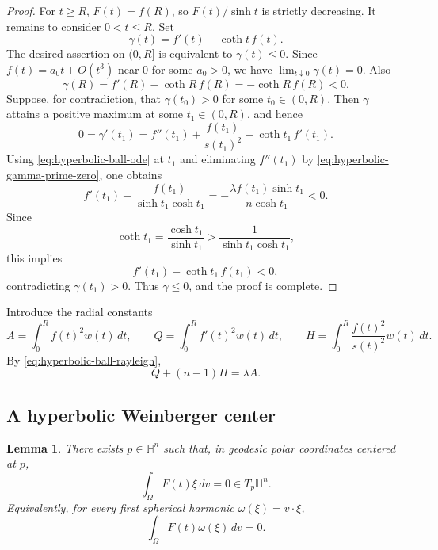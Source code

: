 \documentclass[10pt,a4paper]{amsart}
\newtheorem{lemma}[theorem]{Lemma}
\newcommand{\HH}{\mathbb H}
\begin{document}
\begin{proof}
For $t\ge R$, $F(t)=f(R)$, so $F(t)/\sinh t$ is strictly decreasing.  It remains to consider $0<t\le R$.
Set
$$
        \gamma(t)=f'(t)-\coth t\,f(t).
$$
The desired assertion on $(0,R]$ is equivalent to $\gamma(t)\le0$.  Since $f(t)=a_0t+O(t^3)$ near $0$ for some $a_0>0$, we have $\lim_{t\downarrow0}\gamma(t)=0$.  Also
$$
        \gamma(R)=f'(R)-\coth R\,f(R)=-\coth R\,f(R)<0.
$$
Suppose, for contradiction, that $\gamma(t_0)>0$ for some $t_0\in(0,R)$.  Then $\gamma$ attains a positive maximum at some $t_1\in(0,R)$, and hence
\begin{equation}\label{eq:hyperbolic-gamma-prime-zero}
        0=\gamma'(t_1)=f''(t_1)+\frac{f(t_1)}{s(t_1)^2}-\coth t_1\,f'(t_1).
\end{equation}
Using \eqref{eq:hyperbolic-ball-ode} at $t_1$ and eliminating $f''(t_1)$ by \eqref{eq:hyperbolic-gamma-prime-zero}, one obtains
$$
        f'(t_1)-\frac{f(t_1)}{\sinh t_1\cosh t_1}
        =-\frac{\lambda f(t_1)\sinh t_1}{n\cosh t_1}<0.
$$
Since
$$
        \coth t_1=\frac{\cosh t_1}{\sinh t_1}
        >\frac{1}{\sinh t_1\cosh t_1},
$$
this implies
$$
        f'(t_1)-\coth t_1\,f(t_1)<0,
$$
contradicting $\gamma(t_1)>0$.  Thus $\gamma\le0$, and the proof is complete.
\end{proof}

Introduce the radial constants
\begin{equation}\label{eq:hyperbolic-AQH-def}
        A=\int_0^R f(t)^2w(t)\,dt,
        \qquad
        Q=\int_0^R f'(t)^2w(t)\,dt,
        \qquad
        H=\int_0^R \frac{f(t)^2}{s(t)^2}w(t)\,dt.
\end{equation}
By \eqref{eq:hyperbolic-ball-rayleigh},
\begin{equation}\label{eq:hyperbolic-eigen-identity}
        Q+(n-1)H=\lambda A.
\end{equation}

\subsection{A hyperbolic Weinberger center}

\begin{lemma}\label{lem:hyperbolic-center}
There exists $p\in\HH^n$ such that, in geodesic polar coordinates centered at $p$,
\begin{equation}\label{eq:hyperbolic-center}
        \int_\Omega F(t)\xi\,dv=0\in T_p\HH^n.
\end{equation}
Equivalently, for every first spherical harmonic $\omega(\xi)=v\cdot\xi$,
$$
        \int_\Omega F(t)\omega(\xi)\,dv=0.
$$
\end{lemma}
\end{document}
